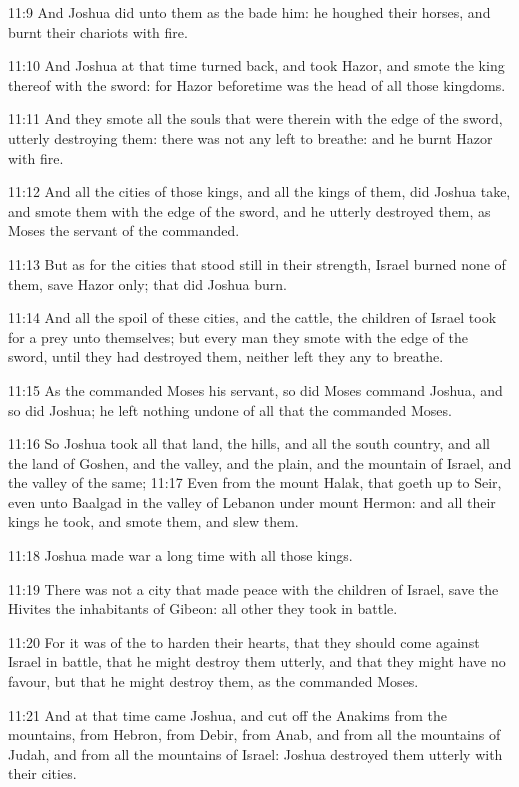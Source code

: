 11:9 And Joshua did unto them as the \LORD bade him: he houghed their horses, and burnt their chariots with fire.

11:10 And Joshua at that time turned back, and took Hazor, and smote the king thereof with the sword: for Hazor beforetime was the head of all those kingdoms.

11:11 And they smote all the souls that were therein with the edge of the sword, utterly destroying them: there was not any left to breathe: and he burnt Hazor with fire.

11:12 And all the cities of those kings, and all the kings of them, did Joshua take, and smote them with the edge of the sword, and he utterly destroyed them, as Moses the servant of the \LORD commanded.

11:13 But as for the cities that stood still in their strength, Israel burned none of them, save Hazor only; that did Joshua burn.

11:14 And all the spoil of these cities, and the cattle, the children of Israel took for a prey unto themselves; but every man they smote with the edge of the sword, until they had destroyed them, neither left they any to breathe.

11:15 As the \LORD commanded Moses his servant, so did Moses command Joshua, and so did Joshua; he left nothing undone of all that the \LORD commanded Moses.

11:16 So Joshua took all that land, the hills, and all the south country, and all the land of Goshen, and the valley, and the plain, and the mountain of Israel, and the valley of the same; 11:17 Even from the mount Halak, that goeth up to Seir, even unto Baalgad in the valley of Lebanon under mount Hermon: and all their kings he took, and smote them, and slew them.

11:18 Joshua made war a long time with all those kings.

11:19 There was not a city that made peace with the children of Israel, save the Hivites the inhabitants of Gibeon: all other they took in battle.

11:20 For it was of the \LORD to harden their hearts, that they should come against Israel in battle, that he might destroy them utterly, and that they might have no favour, but that he might destroy them, as the \LORD commanded Moses.

11:21 And at that time came Joshua, and cut off the Anakims from the mountains, from Hebron, from Debir, from Anab, and from all the mountains of Judah, and from all the mountains of Israel: Joshua destroyed them utterly with their cities.

